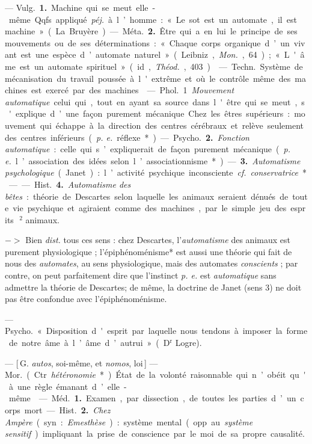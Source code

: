 \begin{itemize}[leftmargin=1cm, label=, itemsep=1pt]
 — \si{Vulg.} {\bf 1.} Machine qui se
meut elle-même. Qqfs. appliqué {\it péj.}
à l’homme : « Le sot est un automate,
il est machine » (La Bruyère).

— \si{Méta.} {\bf 2.} Être qui a en lui le
principe de ses mouvements ou de
ses déterminations : « Chaque corps
organique d’un vivant est une espèce
d’automate naturel » (Leibniz, {\it Mon.},
64); « L'âme est un automate spirituel » (id., {\it Théod.}, 403).

 — \si{Techn.} Système de
mécanisation du travail poussée à
l'extrême et où le contrôle même
des machines est exercé par des
machines.

 — \si{Phol.} 1 {\it Mouvement
automatique} celui qui, tout en
ayant sa source dans l'être qui se
meut, s'explique d’une façon purement mécanique. Chez les êtres
supérieurs : mouvement qui échappe
à la direction des centres cérébraux
et relève seulement des centres inférieurs ({\it p. e.} réflexe*).

— \si{Psycho.} {\bf 2.} {\it Fonction automatique} : celle qui s’expliquerait de
façon purement mécanique ({\it p. e.} l’association des idées selon
l’associationnisme*). — {\bf 3.} {\it Automatisme psychologique} (Janet) :
l’activité psychique inconsciente. {\it cf.}  {\it conservatrice}*.

—— \si{Hist.} {\bf 4.} {\it Automatisme des bêtes} :
théorie de Descartes selon laquelle
les animaux seraient dénués de toute
vie psychique et agiraient comme
des machines, par le simple jeu des
esprits\,$^2$ animaux.

$->$ Bien {\it dist.} tous ces sens :
chez Descartes, l’{\it automatisme} des
animaux est purement physiologique ; l’épiphénoménisme* est aussi
une théorie qui fait de nous des
{\it automates}, au sens physiologique,
mais des automates {\it conscients} ; par
contre, on peut parfaitement dire
que l'instinct {\it p. e.} est {\it automatique}
sans admettre la théorie de Descartes; de même, la doctrine de
Janet (sens 3) ne doit pas être confondue avec l’épiphénoménisme.

 — \si{Psycho.} « Disposition d'esprit par laquelle nous
tendons à imposer la forme de notre
âme à l’âme d’autrui » (D$^\text{r}$ Logre).

 — [\,G. {\it autos}, soi-même, et
{\it nomos}, loi\,] — \si{Mor.} (Ctr. {\it hétéronomie}*). État de la volonté
raisonnable qui n’obéit qu'à une règle
émanant d’elle-même.

 — \si{Méd.} {\bf 1.} Examen, par dissection, de toutes les parties d’un
corps mort. — \si{Hist.} {\bf 2.} {\it Chez Ampère}
(syn. : {\it Emesthèse}) : système mental
(opp. au {\it système sensitif}) impliquant
la prise de conscience par le moi de
sa propre causalité.


\end{itemize}
